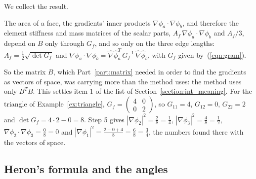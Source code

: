 We collect the result.
\begin{prop}
\label{prop:metric_only}
The area of a face, the gradients' inner products $\nabla\phi_a \cdot \nabla\phi_b$, and therefore the element stiffness and mass matrices of the scalar parts, $A_f\, \nabla\phi_a \cdot \nabla\phi_b$ and $A_f / 3$, depend on $B$ only through $G_f$, and so only on the three edge lengths: $A_f = \frac12\sqrt{\det G_f}$ and $\nabla\phi_a \cdot \nabla\phi_b = \hat\nabla\hat\phi_a^T\, G_f^{-1}\, \hat\nabla\hat\phi_b$, with $G_f$ given by~(\ref{eqn:gram}).
\end{prop}
So the matrix $B$, which Part~\ref{part:matrix} needed in order to find the gradients as vectors of space, was carrying more than the method uses: the method uses only $B^T B$. This settles item 1 of the list of Section~\ref{section:int_meaning}. For the triangle of Example~\ref{ex:triangle}, $G_f = \left(\begin{smallmatrix} 4 & 0 \\ 0 & 2\end{smallmatrix}\right)$, so $G_{11} = 4$, $G_{12} = 0$, $G_{22} = 2$ and $\det G_f = 4\cdot 2 - 0 = 8$. Step 5 gives $|\nabla\phi_2|^2 = \frac28 = \frac14$, $|\nabla\phi_3|^2 = \frac48 = \frac12$, $\nabla\phi_2 \cdot \nabla\phi_3 = \frac08 = 0$ and $|\nabla\phi_1|^2 = \frac{2 - 0 + 4}{8} = \frac68 = \frac34$, the numbers found there with the vectors of space.

\subsection{Heron's formula and the angles}


